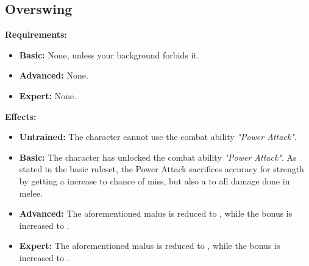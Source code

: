 \documentclass[openany,10pt,a4paper]{book}
\begin{document}
\subsection{Overswing}
\begin{table}[!ht]
\centering
{}
\end{table}
\textbf{Requirements:}
\begin{itemize}
	\item \textbf{Basic:} None, unless your background forbids it.
	\item \textbf{Advanced:} None.
	\item \textbf{Expert:} None.
\end{itemize}
\textbf{Effects:}
\begin{itemize}
	\item \textbf{Untrained:} The character cannot use the combat ability \textit{"Power Attack"}.
	\item \textbf{Basic:} The character has unlocked the combat ability \textit{"Power Attack"}. As stated in the basic ruleset, the Power Attack sacrifices accuracy for strength by getting a  increase to chance of miss, but also a  to all damage done in melee.
	\item \textbf{Advanced:} The aforementioned malus is reduced to , while the bonus is increased to .
	\item \textbf{Expert:} The aforementioned malus is reduced to , while the bonus is increased to .
\end{itemize}\newpage
\end{document}
